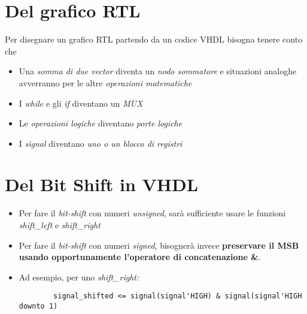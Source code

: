 \documentclass{article}
\begin{document}
\section{Del grafico RTL}
Per disegnare un grafico RTL partendo da un codice VHDL bisogna tenere conto che
\begin{itemize}
	\item Una \textit{somma di due vector} diventa un \textit{nodo sommatore} e situazioni analoghe avverranno per le altre \textit{operazioni matematiche}
	\item I \textit{while} e gli \textit{if} diventano un \textit{MUX}
	\item Le \textit{operazioni logiche} diventano \textit{porte logiche}
	\item I \textit{signal} diventano \textit{uno o un blocco di registri}
\end{itemize}

\section{Del Bit Shift in VHDL}
\begin{itemize}
	\item Per fare il \textit{bit-shift} con numeri \textit{unsigned}, sarà sufficiente usare le funzioni \textit{shift\_left} e \textit{shift\_right}
	\item Per fare il \textit{bit-shift} con numeri \textit{signed}, bisognerà invece \textbf{preservare il MSB usando opportunamente l'operatore di concatenazione \&}. 
	\item Ad esempio, per uno \textit{shift\_right:}
	\begin{verbatim}
	    signal_shifted <= signal(signal'HIGH) & signal(signal'HIGH downto 1)
	\end{verbatim}
\end{itemize}
\end{document}

